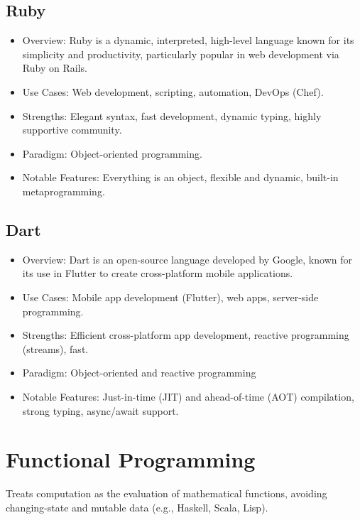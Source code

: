 \documentclass[openany]{book} %
\begin{document}
\subsection{Ruby}
\begin{itemize}
\item Overview: Ruby is a dynamic, interpreted, high-level language known for its simplicity and productivity, particularly popular in web development via Ruby on Rails.
\item Use Cases: Web development, scripting, automation, DevOps (Chef).
\item Strengths: Elegant syntax, fast development, dynamic typing, highly supportive community.
\item Paradigm: Object-oriented programming.
\item Notable Features: Everything is an object, flexible and dynamic, built-in metaprogramming.
\end{itemize}

\subsection{Dart}
\begin{itemize}
\item Overview: Dart is an open-source language developed by Google, known for its use in Flutter to create cross-platform mobile applications.
\item Use Cases: Mobile app development (Flutter), web apps, server-side programming.
\item Strengths: Efficient cross-platform app development, reactive programming (streams), fast.
\item Paradigm: Object-oriented and reactive programming
\item Notable Features: Just-in-time (JIT) and ahead-of-time (AOT) compilation, strong typing, async/await support.
\end{itemize}

\section{Functional Programming}
Treats computation as the evaluation of mathematical functions, avoiding changing-state and mutable data (e.g., Haskell, Scala, Lisp).
\end{document}
